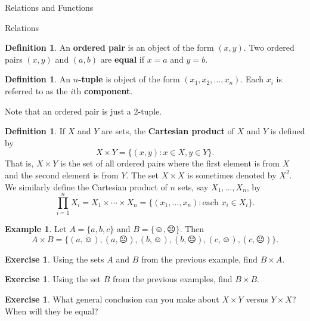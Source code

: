 \documentclass[11pt]{article}
\theoremstyle{definition}
\newtheorem{definition}[theorem]{Definition}
\newtheorem{example}[theorem]{Example}
\newtheorem{exercise}[theorem]{Exercise}
\begin{document}
\addtocounter{section}{3}

\begin{section}{Relations and Functions}

\begin{subsection}{Relations}

\begin{definition}
An \textbf{ordered pair} is an object of the form $(x,y)$. Two ordered pairs $(x,y)$ and $(a,b)$ are \textbf{equal} if $x=a$ and $y=b$. 
\end{definition}

\begin{definition}
An \textbf{$n$-tuple} is object of the form $(x_1, x_2,\ldots,x_n)$.  Each $x_i$ is referred to as the $i$th \textbf{component}.
\end{definition}

Note that an ordered pair is just a 2-tuple.

\begin{definition}
If $X$ and $Y$ are sets, the \textbf{Cartesian product} of $X$ and $Y$ is defined by
\[
X\times Y=\{(x,y): x\in X, y\in Y\}.
\]
That is, $X\times Y$ is the set of all ordered pairs where the first element is from $X$ and the second element is from $Y$.  The set $X\times X$ is sometimes denoted by $X^2$.  We similarly define the Cartesian product of $n$ sets, say $X_1, \ldots, X_n$, by
\[
\prod_{i=1}^{n} X_i=X_1\times \cdots \times X_n=\{(x_1,\ldots,x_n): \mbox{each } x_i\in X_i\}.
\]
\end{definition}

\begin{example}
Let $A=\{a,b,c\}$ and $B=\{\smiley,\frownie\}$.  Then 
\[
A\times B=\{(a,\smiley), (a,\frownie),(b,\smiley),(b,\frownie), (c,\smiley),(c,\frownie)\}.
\]
\end{example}

\begin{exercise}
Using the sets $A$ and $B$ from the previous example, find $B\times A$.  
\end{exercise}

\begin{exercise}
Using the set $B$ from the previous examples, find $B\times B$.  
\end{exercise}

\begin{exercise}
What general conclusion can you make about $X\times Y$ versus $Y\times X$?  When will they be equal?
\end{exercise}


\end{subsection}
\end{section}
\end{document}
